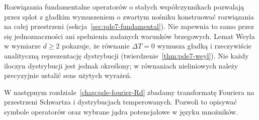 Rozwiązania fundamentalne operatorów o stałych
współczynnikach pozwalają przez splot z gładkim
wymuszeniem o zwartym nośniku konstruować rozwiązania
na całej przestrzeni (sekcja~\ref{sec:pde7-fundamental}).
Nie zapewnia to samo przez się jednoznaczności
ani spełnienia zadanych warunków brzegowych.
Lemat Weyla w wymiarze $d\ge2$ pokazuje,
że równanie $\Delta T=0$ wymusza gładką i rzeczywiście analityczną
reprezentację dystrybucji
(twierdzenie~\ref{thm:pde7-weyl}).
Nie każdy iloczyn dystrybucji jest jednak określony;
w równaniach nieliniowych należy precyzyjnie
ustalić sens użytych wyrażeń.

W następnym rozdziale~\ref{chap:pde-fourier-Rd}
zbadamy transformatę Fouriera na przestrzeni Schwartza
i dystrybucjach temperowanych. Pozwoli to opisywać
symbole operatorów oraz wybrane jądra potencjałowe
w języku mnożników.

